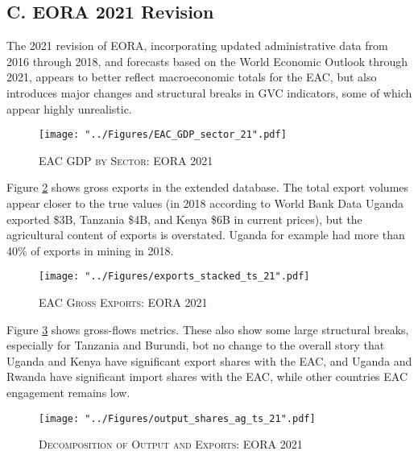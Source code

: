 \documentclass[a4paper]{article}
\begin{document}
\subsection*{C. EORA 2021 Revision}
\setcounter{table}{0}
\renewcommand{\thetable}{C\arabic{table}}
\setcounter{figure}{0}
\renewcommand{\thefigure}{C\arabic{figure}}

The 2021 revision of EORA, incorporating updated administrative data from 2016 through 2018, and forecasts based on the World Economic Outlook through 2021, appears to better reflect macroeconomic totals for the EAC, but also introduces major changes and structural breaks in GVC indicators, some of which appear highly unrealistic. 

\begin{figure}[h!]
\centering
\caption{\label{fig:EAC_GDP_sec_21}\textsc{EAC GDP by Sector: EORA 2021}}
\texttt{[image: "../Figures/EAC\_GDP\_sector\_21".pdf]} %
\end{figure}
\FloatBarrier


Figure \ref{fig:exp21} shows gross exports in the extended database. The total export volumes appear closer to the true values (in 2018 according to World Bank Data Uganda exported \$3B, Tanzania \$4B, and Kenya \$6B in current prices), but the agricultural content of exports is overstated. Uganda for example had more than 40\% of exports in mining in 2018. 

\begin{figure}[h!]
\centering
\caption{\label{fig:exp21}\textsc{EAC Gross Exports: EORA 2021}}
\texttt{[image: "../Figures/exports\_stacked\_ts\_21".pdf]} %
\end{figure}
\FloatBarrier

Figure \ref{fig:outshares_ag_ts_21} shows gross-flows metrics. These also show some large structural breaks, especially for Tanzania and Burundi, bot no change to the overall story that Uganda and Kenya have significant export shares with the EAC, and Uganda and Rwanda have significant import shares with the EAC, while other countries EAC engagement remains low. 

\begin{figure}[h!]
\centering
\caption{\label{fig:outshares_ag_ts_21}\textsc{Decomposition of Output and Exports: EORA 2021}}
\texttt{[image: "../Figures/output\_shares\_ag\_ts\_21".pdf]} %
\end{figure}
\FloatBarrier
\end{document}
